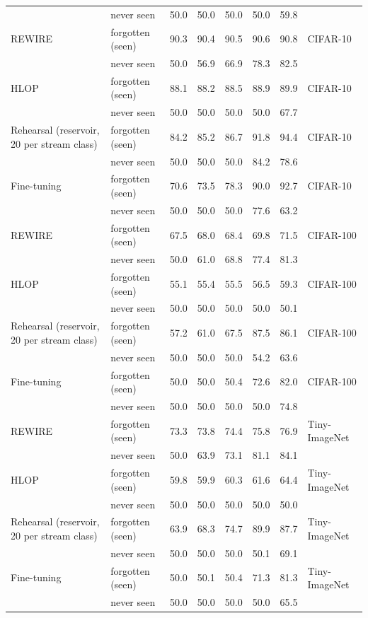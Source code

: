 \begin{tabular*}{\textwidth}{@{\extracolsep{\fill}}llrrrrrl@{}}
 & never seen & 50.0 & 50.0 & 50.0 & 50.0 & 59.8 & \\
REWIRE & forgotten (seen) & 90.3 & 90.4 & 90.5 & 90.6 & 90.8 & CIFAR-10 \\
 & never seen & 50.0 & 56.9 & 66.9 & 78.3 & 82.5 & \\
HLOP & forgotten (seen) & 88.1 & 88.2 & 88.5 & 88.9 & 89.9 & CIFAR-10 \\
 & never seen & 50.0 & 50.0 & 50.0 & 50.0 & 67.7 & \\
Rehearsal (reservoir, 20 per stream class) & forgotten (seen) & 84.2 & 85.2 & 86.7 & 91.8 & 94.4 & CIFAR-10 \\
 & never seen & 50.0 & 50.0 & 50.0 & 84.2 & 78.6 & \\
Fine-tuning & forgotten (seen) & 70.6 & 73.5 & 78.3 & 90.0 & 92.7 & CIFAR-10 \\
 & never seen & 50.0 & 50.0 & 50.0 & 77.6 & 63.2 & \\
REWIRE & forgotten (seen) & 67.5 & 68.0 & 68.4 & 69.8 & 71.5 & CIFAR-100 \\
 & never seen & 50.0 & 61.0 & 68.8 & 77.4 & 81.3 & \\
HLOP & forgotten (seen) & 55.1 & 55.4 & 55.5 & 56.5 & 59.3 & CIFAR-100 \\
 & never seen & 50.0 & 50.0 & 50.0 & 50.0 & 50.1 & \\
Rehearsal (reservoir, 20 per stream class) & forgotten (seen) & 57.2 & 61.0 & 67.5 & 87.5 & 86.1 & CIFAR-100 \\
 & never seen & 50.0 & 50.0 & 50.0 & 54.2 & 63.6 & \\
Fine-tuning & forgotten (seen) & 50.0 & 50.0 & 50.4 & 72.6 & 82.0 & CIFAR-100 \\
 & never seen & 50.0 & 50.0 & 50.0 & 50.0 & 74.8 & \\
REWIRE & forgotten (seen) & 73.3 & 73.8 & 74.4 & 75.8 & 76.9 & Tiny-ImageNet \\
 & never seen & 50.0 & 63.9 & 73.1 & 81.1 & 84.1 & \\
HLOP & forgotten (seen) & 59.8 & 59.9 & 60.3 & 61.6 & 64.4 & Tiny-ImageNet \\
 & never seen & 50.0 & 50.0 & 50.0 & 50.0 & 50.0 & \\
Rehearsal (reservoir, 20 per stream class) & forgotten (seen) & 63.9 & 68.3 & 74.7 & 89.9 & 87.7 & Tiny-ImageNet \\
 & never seen & 50.0 & 50.0 & 50.0 & 50.1 & 69.1 & \\
Fine-tuning & forgotten (seen) & 50.0 & 50.1 & 50.4 & 71.3 & 81.3 & Tiny-ImageNet \\
 & never seen & 50.0 & 50.0 & 50.0 & 50.0 & 65.5 & \\
\bottomrule
\end{tabular*}
